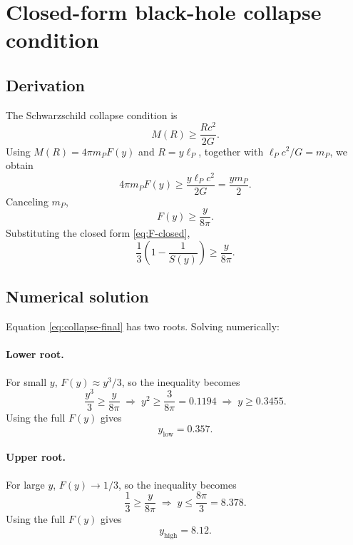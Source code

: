 \documentclass[12pt,oneside,openany]{book}
\begin{document}
\section{Closed-form black-hole collapse condition}

\subsection{Derivation}

The Schwarzschild collapse condition is
\begin{equation}
M(R)\ge\frac{Rc^{2}}{2G}.
\label{eq:collapse}
\end{equation}
Using $M(R)=4\pi m_{P}F(y)$ and $R=y\ell_{P}$, together with
$\ell_{P}c^{2}/G=m_{P}$, we obtain
\begin{equation}
4\pi m_{P}F(y)\ge\frac{y\ell_{P}c^{2}}{2G}
=\frac{y m_{P}}{2}.
\label{eq:collapse-step1}
\end{equation}
Canceling $m_{P}$,
\begin{equation}
\boxed{\;F(y)\ge\frac{y}{8\pi}.\;}
\label{eq:collapse-condition}
\end{equation}
Substituting the closed form \eqref{eq:F-closed},
\begin{equation}
\frac{1}{3}\left(1-\frac{1}{S(y)}\right)\ge\frac{y}{8\pi}.
\label{eq:collapse-final}
\end{equation}

\subsection{Numerical solution}

Equation \eqref{eq:collapse-final} has two roots. Solving
numerically:

\paragraph{Lower root.}
For small $y$, $F(y)\approx y^{3}/3$, so the inequality becomes
\begin{equation}
\frac{y^{3}}{3}\ge\frac{y}{8\pi}
\;\Longrightarrow\;
y^{2}\ge\frac{3}{8\pi}=0.1194
\;\Longrightarrow\;
y\ge0.3455.
\label{eq:lower-approx}
\end{equation}
Using the full $F(y)$ gives
\begin{equation}
y_{\text{low}}=0.357.
\label{eq:ylow}
\end{equation}

\paragraph{Upper root.}
For large $y$, $F(y)\to 1/3$, so the inequality becomes
\begin{equation}
\frac{1}{3}\ge\frac{y}{8\pi}
\;\Longrightarrow\;
y\le\frac{8\pi}{3}=8.378.
\label{eq:upper-approx}
\end{equation}
Using the full $F(y)$ gives
\begin{equation}
y_{\text{high}}=8.12.
\label{eq:yhigh}
\end{equation}
\end{document}
